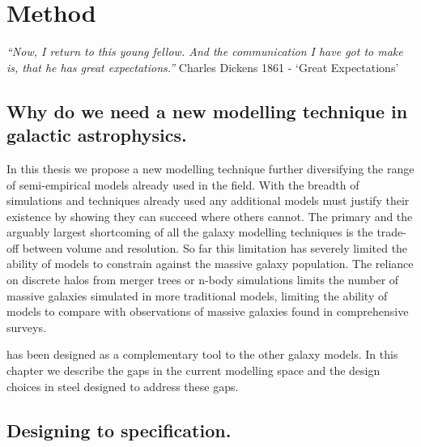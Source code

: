 
\chapter{Method} %
\label{Chapter:Method}
\begin{center}
    \textit{``Now, I return to this young fellow. And the communication I have got to make is, that he has great expectations.''}
    Charles Dickens 1861 - `Great Expectations'
\end{center}

\section{Why do we need a new modelling technique in galactic astrophysics.}
In this thesis we propose a new modelling technique further diversifying the range of semi-empirical models already used in the field. With the breadth of simulations and techniques already used any additional models must justify their existence by showing they can succeed where others cannot. The primary and the arguably largest shortcoming of all the galaxy modelling techniques is the trade-off between volume and resolution. So far this limitation has severely limited the ability of models to constrain against the massive galaxy population. The reliance on discrete halos from merger trees or n-body simulations limits the number of massive galaxies simulated in more traditional models, limiting the ability of models to compare with observations of massive galaxies found in comprehensive surveys. 

\steel has been designed as a complementary tool to the other galaxy models. In this chapter we describe the gaps in the current modelling space and the design choices in steel designed to address these gaps.

\section{Designing to specification.}
